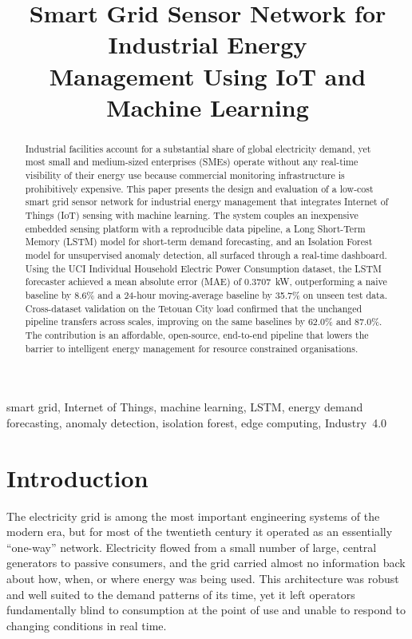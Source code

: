 \documentclass[conference]{IEEEtran}
\begin{document}
\title{Smart Grid Sensor Network for Industrial Energy\\
Management Using IoT and Machine Learning}

\author{
}

\maketitle
\begin{abstract}
Industrial facilities account for a substantial share of global electricity
demand, yet most small and medium-sized enterprises (SMEs) operate without any
real-time visibility of their energy use because commercial monitoring
infrastructure is prohibitively expensive. This paper presents the design and
evaluation of a low-cost smart grid sensor network for industrial energy
management that integrates Internet of Things (IoT) sensing with machine
learning. The system couples an inexpensive embedded sensing platform with a
reproducible data pipeline, a Long Short-Term Memory (LSTM) model for
short-term demand forecasting, and an Isolation Forest model for unsupervised
anomaly detection, all surfaced through a real-time dashboard. Using the UCI
Individual Household Electric Power Consumption dataset, the LSTM forecaster
achieved a mean absolute error (MAE) of 0.3707~kW, outperforming a naive
baseline by 8.6\% and a 24-hour moving-average baseline by 35.7\% on unseen
test data. Cross-dataset validation on the Tetouan City load confirmed that the unchanged
pipeline transfers across scales, improving on the same baselines by 62.0\% and
87.0\%. The contribution is an affordable, open-source, end-to-end pipeline
that lowers the barrier to intelligent energy management for resource constrained organisations.
\end{abstract}

\begin{IEEEkeywords}
smart grid, Internet of Things, machine learning, LSTM, energy demand
forecasting, anomaly detection, isolation forest, edge computing, Industry~4.0
\end{IEEEkeywords}

\section{Introduction}
The electricity grid is among the most important engineering systems of the
modern era, but for most of the twentieth century it operated as an essentially
``one-way'' network. Electricity flowed from a small number of large, central
generators to passive consumers, and the grid carried almost no information back
about how, when, or where energy was being used. This architecture was robust
and well suited to the demand patterns of its time, yet it left operators
fundamentally blind to consumption at the point of use and unable to respond to
changing conditions in real time.
\end{document}
